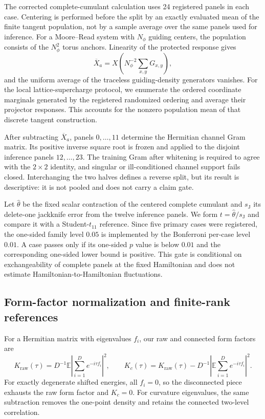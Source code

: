 The corrected complete-cumulant calculation uses 24 registered panels in
each case.  Centering is performed before the split by an exactly evaluated
mean of the finite tangent population, not by a sample average over the same
panels used for inference.  For a Moore--Read system with $N_\phi$ guiding
centers, the population consists of the $N_\phi^2$ torus anchors.  Linearity
of the protected response gives
\[
 \overline X_a=X\!\left(
 N_\phi^{-2}\sum_{x,y}G_{x,y}
 \right),
\]
and the uniform average of the traceless guiding-density generators vanishes.
For the local lattice-supercharge protocol, we enumerate the ordered
coordinate marginals generated by the registered randomized ordering and
average their projector responses.  This accounts for the nonzero population
mean of that discrete tangent construction.

After subtracting $\overline X_a$, panels $0,\ldots,11$ determine the Hermitian
channel Gram matrix.  Its positive inverse square root is frozen and applied
to the disjoint inference panels $12,\ldots,23$.  The training Gram after
whitening is required to agree with the $2\times2$ identity, and singular or
ill-conditioned channel support fails closed.  Interchanging the two halves
defines a reverse split, but its result is descriptive: it is not pooled and
does not carry a claim gate.

Let $\widehat\theta$ be the fixed scalar contraction of the centered complete
cumulant and $s_{\mathrm J}$ its delete-one jackknife error from the twelve
inference panels.  We form $t=\widehat\theta/s_{\mathrm J}$ and compare it with
a Student-$t_{11}$ reference.  Since five primary cases were registered, the
one-sided family level $0.05$ is implemented by the Bonferroni per-case level
$0.01$.  A case passes only if its one-sided $p$ value is below $0.01$ and the
corresponding one-sided lower bound is positive.  This gate is conditional on
exchangeability of complete panels at the fixed Hamiltonian and does not
estimate Hamiltonian-to-Hamiltonian fluctuations.

\subsection{Form-factor normalization and finite-rank references}

For a Hermitian matrix with eigenvalues $f_i$, our raw and connected form
factors are
\[
 K_{\mathrm{raw}}(\tau)=D^{-1}\mathbb E
 \left|\sum_{i=1}^{D}e^{-i\tau f_i}\right|^2,
 \qquad
 K_c(\tau)=K_{\mathrm{raw}}(\tau)
 -D^{-1}\left|\mathbb E\sum_{i=1}^{D}e^{-i\tau f_i}\right|^2.
\]
For exactly degenerate shifted energies, all $f_i=0$, so the disconnected
piece exhausts the raw form factor and $K_c=0$.  For curvature eigenvalues,
the same subtraction removes the one-point density and retains the connected
two-level correlation.

